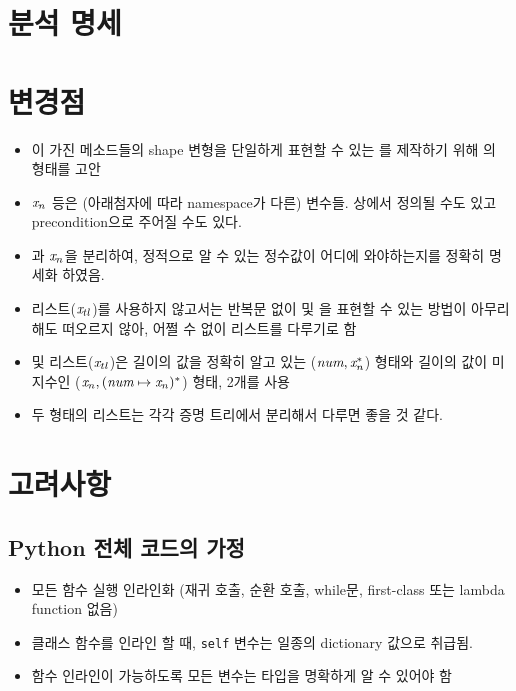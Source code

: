 \documentclass{article}
\begin{document}
\newpage

\section{분석 명세}



\section{변경점}

\begin{itemize}
\item {}이 가진 메소드들의 shape 변형을 단일하게 표현할 수 있는 를 제작하기 위해 의 형태를 고안
\item $\textit{x}_{n}$ 등은 (아래첨자에 따라 namespace가 다른) 변수들.  상에서 정의될 수도 있고 precondition으로 주어질 수도 있다.
\item {}과 $\textit{x}_{n}$을 분리하여, 정적으로 알 수 있는 정수값이 어디에 와야하는지를 정확히 명세화 하였음.
\item 리스트($\textit{x}_{tl}$)를 사용하지 않고서는 반복문 없이  및 을 표현할 수 있는 방법이 아무리 해도 떠오르지 않아, 어쩔 수 없이 리스트를 다루기로 함
\item {} 및 리스트($\textit{x}_{tl}$)은 길이의 값을 정확히 알고 있는 ($\textit{num}, \textit{x}_{n}^{*}$) 형태와 길이의 값이 미지수인 ($\textit{x}_{n}, (\textit{num} \mapsto \textit{x}_{n})^{*}$) 형태, 2개를 사용
\item 두 형태의 리스트는 각각 증명 트리에서 분리해서 다루면 좋을 것 같다.
\end{itemize}

\section{고려사항}

\subsection{Python 전체 코드의 가정}
\begin{itemize}
  \item 모든 함수 실행 인라인화 (재귀 호출, 순환 호출, while문, first-class 또는 lambda function 없음)
  \item 클래스 함수를 인라인 할 때, \texttt{self} 변수는 일종의 dictionary 값으로 취급됨.
  \item 함수 인라인이 가능하도록 모든 변수는 타입을 명확하게 알 수 있어야 함
\end{itemize}
\end{document}
